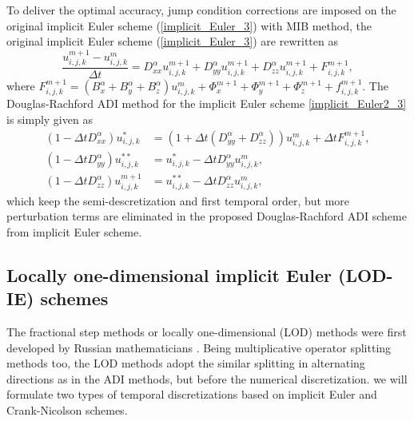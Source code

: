 \documentclass[dissertation]{uathesis}
\begin{document}
\begin{body}
\begin{flushleft}
\hspace{1cm} To deliver the optimal accuracy, jump condition corrections are imposed on the original implicit Euler scheme (\ref{implicit_Euler_3}) with MIB method, the original implicit Euler scheme (\ref{implicit_Euler_3}) are rewritten as  
%
\begin{equation} \label{implicit_Euler2_3}
\frac{u^{m+1}_{i,j,k}-u^{m}_{i,j,k}}{\Delta t} = 
D^{\alpha}_{xx} u^{m+1}_{i,j,k} +D^{\alpha}_{yy} u^{m+1}_{i,j,k} +D^{\alpha}_{zz} u^{m+1}_{i,j,k} + F^{m+1}_{i,j,k},
\end{equation}
%
where $F^{m+1}_{i,j,k}=(B^{\alpha}_{x}+B^{\alpha}_{y}+B^{\alpha}_{z})u^{m}_{i,j,k}+\Phi^{m+1}_{x}+\Phi^{m+1}_{y}+\Phi^{m+1}_{z}+f^{m+1}_{i,j,k}$. The Douglas-Rachford ADI method for the implicit Euler scheme \eqref{implicit_Euler2_3} is simply given as 
%
\begin{align} \label{D_ADI_2_3}
(1-\Delta t D^{\alpha}_{xx}) u^{*}_{i,j,k}   &= (1 + \Delta t (D^{\alpha}_{yy} + D^{\alpha}_{zz})) u^{m}_{i,j,k} + \Delta t F^{m+1}_{i,j,k}, \nonumber \\
(1-\Delta t D^{\alpha}_{yy}) u^{**}_{i,j,k}  &= u^{*}_{i,j,k} - \Delta t D^{\alpha}_{yy} u^{m}_{i,j,k},  \\
(1-\Delta t D^{\alpha}_{zz}) u^{m+1}_{i,j,k} &= u^{**}_{i,j,k} - \Delta t D^{\alpha}_{zz} u^{m}_{i,j,k}, \nonumber
\end{align}
%
which keep the semi-descretization and first temporal order, but more perturbation terms are eliminated in the proposed Douglas-Rachford ADI scheme from implicit Euler scheme. 

\subsection{Locally one-dimensional implicit Euler (LOD-IE) schemes}
\hspace{1cm} The fractional step methods or locally one-dimensional (LOD) methods were first developed by Russian mathematicians \cite{yanenki1971lod}. Being multiplicative operator splitting methods too, the LOD methods adopt the similar splitting in alternating directions as in the ADI methods, but before the numerical discretization. we will formulate two types of temporal discretizations based on implicit Euler and Crank-Nicolson schemes. 


\end{flushleft}
\end{body}
\end{document}
